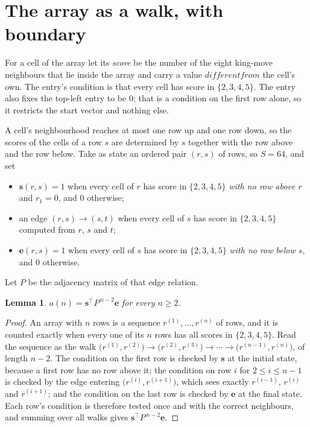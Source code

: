 \documentclass[11pt,a4paper]{article}
\theoremstyle{plain}
\newtheorem{lemma}[theorem]{Lemma}
\theoremstyle{definition}
\begin{document}
\section{The array as a walk, with boundary}

For a cell of the array let its \emph{score} be the number of the eight king-move neighbours that lie inside
the array and carry a value $different from$ the cell's own. The entry's condition is that every cell
has score in $\{2,3,4,5\}$. The entry also fixes the top-left entry to be $0$; that is a condition on the first row alone, so it restricts the start vector and nothing else.

A cell's neighbourhood reaches at most one row up and one row down, so the scores of the
cells of a row $s$ are determined by $s$ together with the row above and the row below.
Take as state an ordered pair $(r,s)$ of rows, so $S=64$, and set
\begin{itemize}
\item $\mathbf{s}(r,s)=1$ when every cell of $r$ has score in $\{2,3,4,5\}$ \emph{with no row
above $r$} and $r_1=0$, and $0$ otherwise;
\item an edge $(r,s)\to(s,t)$ when every cell of $s$ has score in $\{2,3,4,5\}$ computed from
$r$, $s$ and $t$;
\item $\mathbf{e}(r,s)=1$ when every cell of $s$ has score in $\{2,3,4,5\}$ \emph{with no row
below $s$}, and $0$ otherwise.
\end{itemize}
Let $P$ be the adjacency matrix of that edge relation.

\begin{lemma}\label{lem:walk}
$a(n)=\mathbf{s}^{\!\top}P^{\,n-2}\mathbf{e}$ for every $n\ge2$.
\end{lemma}

\begin{proof}
An array with $n$ rows is a sequence $r^{(1)},\dots,r^{(n)}$ of rows, and it is counted
exactly when every one of its $n$ rows has all scores in $\{2,3,4,5\}$. Read the sequence as the
walk $\bigl(r^{(1)},r^{(2)}\bigr)\to\bigl(r^{(2)},r^{(3)}\bigr)\to\cdots\to
\bigl(r^{(n-1)},r^{(n)}\bigr)$, of length $n-2$. The condition on the first row is
checked by $\mathbf{s}$ at the initial state, because a first row has no row above it; the
condition on row $i$ for $2\le i\le n-1$ is checked by the edge entering
$\bigl(r^{(i)},r^{(i+1)}\bigr)$, which sees exactly $r^{(i-1)}$, $r^{(i)}$ and
$r^{(i+1)}$; and the condition on the last row is checked by $\mathbf{e}$ at the final
state. Each row's condition is therefore tested once and with the correct neighbours, and
summing over all walks gives $\mathbf{s}^{\!\top}P^{\,n-2}\mathbf{e}$.
\end{proof}
\end{document}
